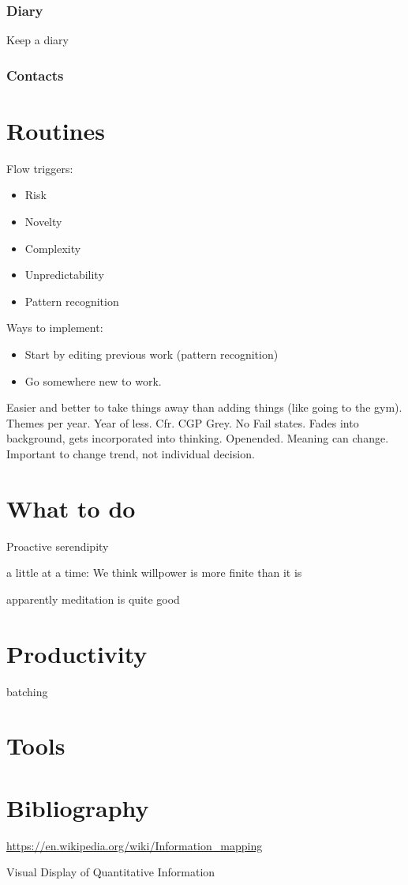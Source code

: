 \documentclass{report}
\begin{document}
\subsection{Diary}
Keep a diary
\subsection{Contacts}
\chapter{Routines}
Flow triggers:
\begin{itemize}
\item Risk
\item Novelty
\item Complexity
\item Unpredictability
\item Pattern recognition
\end{itemize}
Ways to implement:
\begin{itemize}
\item Start by editing previous work (pattern recognition)
\item Go somewhere new to work.
\end{itemize}

Easier and better to take things away than adding things (like going to the gym).
Themes per year. Year of less. Cfr. CGP Grey. No Fail states. Fades into background, gets incorporated into thinking. Openended. Meaning can change. Important to change trend, not individual decision.

\chapter{What to do}
Proactive serendipity

a little at a time: We think willpower is more finite than it is

apparently meditation is quite good

\chapter{Productivity}
batching

\appendix

\chapter{Tools}

\chapter{Bibliography}

\url{https://en.wikipedia.org/wiki/Information_mapping}

Visual Display of Quantitative Information
\end{document}
